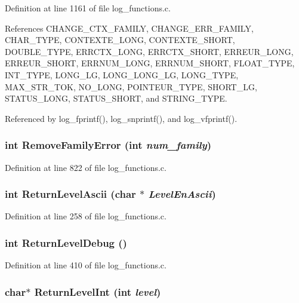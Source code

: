 Definition at line 1161 of file log\_\-functions.c.

References CHANGE\_\-CTX\_\-FAMILY, CHANGE\_\-ERR\_\-FAMILY, CHAR\_\-TYPE, CONTEXTE\_\-LONG, CONTEXTE\_\-SHORT, DOUBLE\_\-TYPE, ERRCTX\_\-LONG, ERRCTX\_\-SHORT, ERREUR\_\-LONG, ERREUR\_\-SHORT, ERRNUM\_\-LONG, ERRNUM\_\-SHORT, FLOAT\_\-TYPE, INT\_\-TYPE, LONG\_\-LG, LONG\_\-LONG\_\-LG, LONG\_\-TYPE, MAX\_\-STR\_\-TOK, NO\_\-LONG, POINTEUR\_\-TYPE, SHORT\_\-LG, STATUS\_\-LONG, STATUS\_\-SHORT, and STRING\_\-TYPE.

Referenced by log\_\-fprintf(), log\_\-snprintf(), and log\_\-vfprintf().
\subsubsection{\setlength{\rightskip}{0pt plus 5cm}int Remove\-Family\-Error (int {\em num\_\-family})}\label{log__functions_8c_a81}




Definition at line 822 of file log\_\-functions.c.
\subsubsection{\setlength{\rightskip}{0pt plus 5cm}int Return\-Level\-Ascii (char $\ast$ {\em Level\-En\-Ascii})}\label{log__functions_8c_a48}




Definition at line 258 of file log\_\-functions.c.
\subsubsection{\setlength{\rightskip}{0pt plus 5cm}int Return\-Level\-Debug ()}\label{log__functions_8c_a59}




Definition at line 410 of file log\_\-functions.c.
\subsubsection{\setlength{\rightskip}{0pt plus 5cm}char$\ast$ Return\-Level\-Int (int {\em level})}\label{log__functions_8c_a49}




